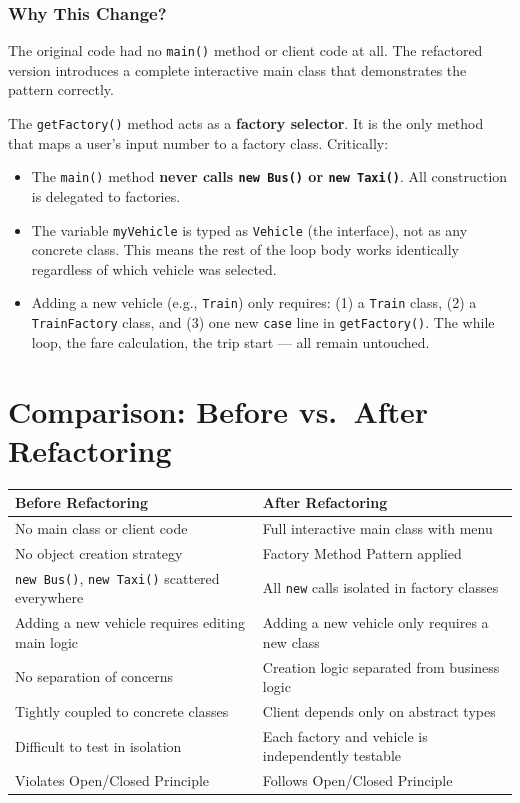\documentclass[12pt, a4paper]{article}
\begin{document}
\subsubsection{Why This Change?}

The original code had no \texttt{main()} method or client code at all. The refactored version introduces a complete interactive main class that demonstrates the pattern correctly.

The \texttt{getFactory()} method acts as a \textbf{factory selector}. It is the only method that maps a user's input number to a factory class. Critically:

\begin{itemize}[leftmargin=*, label=\textcolor{primaryblue}{\textbullet}]
    \item The \texttt{main()} method \textbf{never calls \texttt{new Bus()} or \texttt{new Taxi()}}. All construction is delegated to factories.
    \item The variable \texttt{myVehicle} is typed as \texttt{Vehicle} (the interface), not as any concrete class. This means the rest of the loop body works identically regardless of which vehicle was selected.
    \item Adding a new vehicle (e.g., \texttt{Train}) only requires: (1) a \texttt{Train} class, (2) a \texttt{TrainFactory} class, and (3) one new \texttt{case} line in \texttt{getFactory()}. The while loop, the fare calculation, the trip start --- all remain untouched.
\end{itemize}

\section{Comparison: Before vs.\ After Refactoring}

\begin{center}
\begin{tabular}{p{5.8cm} p{5.8cm}}
\toprule
\textbf{\color{codered}Before Refactoring} & \textbf{\color{codegreen}After Refactoring} \\
\midrule
No main class or client code & Full interactive main class with menu \\[4pt]
No object creation strategy & Factory Method Pattern applied \\[4pt]
\texttt{new Bus()}, \texttt{new Taxi()} scattered everywhere & All \texttt{new} calls isolated in factory classes \\[4pt]
Adding a new vehicle requires editing main logic & Adding a new vehicle only requires a new class \\[4pt]
No separation of concerns & Creation logic separated from business logic \\[4pt]
Tightly coupled to concrete classes & Client depends only on abstract types \\[4pt]
Difficult to test in isolation & Each factory and vehicle is independently testable \\[4pt]
Violates Open/Closed Principle & Follows Open/Closed Principle \\
\bottomrule
\end{tabular}
\end{center}
\end{document}
